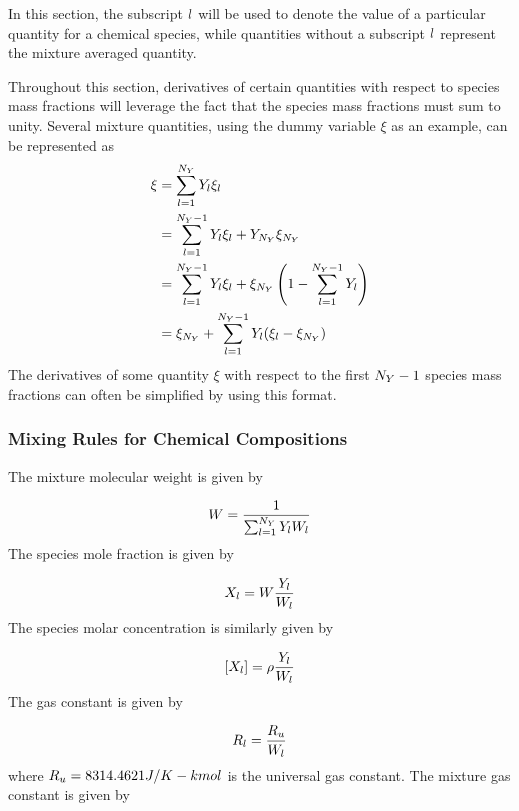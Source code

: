 In this section, the subscript $l$ will be used to denote the value of a particular quantity for a chemical species, while quantities without a subscript $l$ represent the mixture averaged quantity.

Throughout this section, derivatives of certain quantities with respect to species mass fractions will leverage the fact that the species mass fractions must sum to unity. Several mixture quantities, using the dummy variable $\xi$ as an example, can be represented as 
\begin{align}
    \xi &= \sum_{l = 1}^{N_Y} Y_{l} \xi_{l} \\
    &= \sum_{l = 1}^{N_Y-1} Y_{l} \xi_{l} + Y_{N_Y} \xi_{N_Y} \\
    &= \sum_{l = 1}^{N_Y-1} Y_{l} \xi_{l} + \xi_{N_Y} \left( 1 - \sum_{l = 1}^{N_Y-1} Y_{l} \right) \\ 
    &= \xi_{N_Y} + \sum_{l = 1}^{N_Y-1} Y_{l} (\xi_{l} - \xi_{N_Y})
\end{align}
The derivatives of some quantity $\xi$ with respect to the first $N_Y-1$ species mass fractions can often be simplified by using this format.

\subsubsection{Mixing Rules for Chemical Compositions}

The mixture molecular weight is given by

\begin{equation}
	W = \frac{1}{\sum_{l = 1}^{N_Y} Y_{l} W_{l}}
\end{equation}
The species mole fraction is given by

\begin{equation}
	X_{l} = W \frac{Y_{l}}{W_{l}}
\end{equation}
The species molar concentration is similarly given by

\begin{equation}
	[X_{l}] = \rho \frac{Y_{l}}{W_{l}}
\end{equation}
The gas constant is given by

\begin{equation}
	R_{l} = \frac{R_u}{W_{l}}
\end{equation}
where $R_u = 8314.4621 J/K-kmol$ is the universal gas constant. The mixture gas constant is given by

